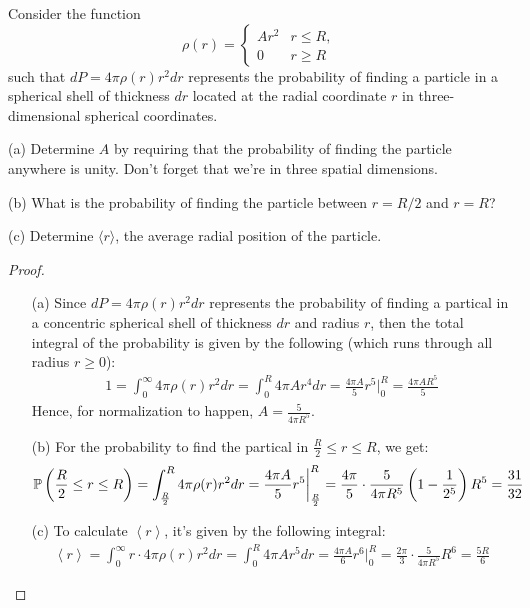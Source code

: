 \documentclass{article}
\begin{document}
\begin{ques}\label{q3}
Consider the function
\[
\rho(r) =
\begin{cases}
Ar^2 & r \leq R,\\
0 & r \geq R
\end{cases}
\]
such that $dP = 4\pi \rho(r) r^2 dr$ represents the probability of finding a particle in a spherical shell of thickness $dr$ located at the radial coordinate $r$ in three-dimensional spherical
coordinates.

(a) Determine $A$ by requiring that the probability of finding the particle anywhere is
unity. Don’t forget that we’re in three spatial dimensions.

(b) What is the probability of finding the particle between $r = R/2$ and $r = R$?

(c) Determine $\langle r\rangle$, the average radial position of the particle.
\end{ques}
\begin{proof}

    \hfil

    \begin{itemize}
        \item[(a)] Since $dP=4\pi \rho(r)r^2 dr$ represents the probability of finding a partical in a concentric spherical shell of thickness $dr$ and radius $r$, then the total integral of the probability is given by the following (which runs through all radius $r\geq 0$):
        \begin{align}
            1 = \int_{0}^{\infty}4\pi\rho(r)r^2 dr = \int_{0}^{R}4\pi A r^4dr = \frac{4\pi A}{5}r^5\bigg|_{0}^{R} = \frac{4\pi AR^5}{5}
        \end{align}
        Hence, for normalization to happen, $A = \frac{5}{4\pi R^5}$.
        \item[(b)] For the probability to find the partical in $\frac{R}{2}\leq r\leq R$, we get:
        \begin{align}
            \mathbb{P}\left(\frac{R}{2}\leq r\leq R\right)=\int_{\frac{R}{2}}^{R}4\pi \rho(r)r^2dr = \frac{4\pi A}{5}r^5\bigg|_{\frac{R}{2}}^{R}=\frac{4\pi }{5}\cdot\frac{5}{4\pi R^5}\left(1-\frac{1}{2^5}\right)R^5 = \frac{31}{32}
        \end{align}
        \item[(c)] To calculate $\left<r\right>$, it's given by the following integral:
        \begin{align}
            \left<r\right>=\int_{0}^{\infty}r \cdot 4\pi \rho(r)r^2 dr = \int_{0}^{R}4\pi A r^5 dr = \frac{4\pi A}{6}r^6\bigg|_{0}^{R} = \frac{2\pi}{3}\cdot \frac{5}{4\pi R^5}R^6=\frac{5R}{6}
        \end{align}
    \end{itemize}
\end{proof}
\newpage
\end{document}
